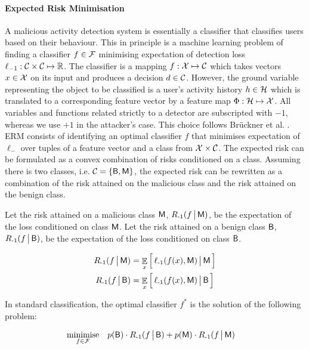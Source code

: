 \paragraph{Expected Risk Minimisation}
A malicious activity detection system is essentially a classifier that classifies users based on their behaviour. This in principle is a machine learning problem of finding a classifier $f \in \mathcal{F}$ minimising expectation of detection loss $\ell_{-1} : \mathcal{C} \times \mathcal{C} \mapsto \mathbb{R}$. The classifier is a mapping $f: \mathcal{X} \mapsto \mathcal{C}$ which takes vectors $x \in \mathcal{X}$ on its input and produces a decision $d \in \mathcal{C}$. However, the ground variable representing the object to be classified is a user's activity history $h \in \mathcal{H}$ which is translated to a corresponding feature vector by a feature map $\Phi: \mathcal{H} \mapsto \mathcal{X}$. All variables and functions related strictly to a detector are subscripted with $-1$, whereas we use $+1$ in the attacker's case. This choice follows Brückner et al. \cite{stackelberg_games}. ERM consists of identifying an optimal classifier $f$ that minimises expectation of $\ell_\minus$ over tuples of a feature vector and a class from $\mathcal{X} \times \mathcal{C}$. The expected risk can be formulated as a convex combination of risks conditioned on a class. Assuming there is two classes, i.e. $\mathcal{C} = \{ \mathsf{B}, \mathsf{M} \}$, the expected risk can be rewritten as a combination of the risk attained on the malicious class and the risk attained on the benign class.

\begin{definition}\label{def:risk}
    Let the risk attained on a malicious class $\mathsf{M}$, $R_{{\text{-}1}}(f \,\big|\, \mathsf{M})$, be the expectation of the loss conditioned on class $\mathsf{M}$. Let the risk attained on a benign class $\mathsf{B}$, $R_{{\text{-}1}}(f \,\big|\, \mathsf{B})$, be the expectation of the loss conditioned on class $\mathsf{B}$.

    \begin{align*}
        R_{{\text{-}1}}(f \,\big|\, \mathsf{M})  &= \mathop{\mathbb{E}}_{x} \Big[\, \ell_{{\text{-}1}}(f(x), \mathsf{M}) \,\big|\, \mathsf{M} \,\Big] \\
        R_{{\text{-}1}}(f \,\big|\, \mathsf{B})  &= \mathop{\mathbb{E}}_{x} \Big[\, \ell_{{\text{-}1}}(f(x), \mathsf{M}) \,\big|\, \mathsf{B} \,\Big]
    \end{align*}

\end{definition}

\begin{definition}\label{def:erm}
    In standard classification, the optimal classifier $f^*$ is the solution of the following problem:

    \begin{equation*}
        \begin{aligned}
        & \underset{f \in \mathcal{F}} {\text{minimise}}
        & & p(\mathsf{B}) \cdot R_{{\text{-}1}}(f \,\big|\, \mathsf{B})
        +
        p(\mathsf{M}) \cdot R_{{\text{-}1}}(f \,\big|\, \mathsf{M})
        \end{aligned}
    \end{equation*}
\end{definition}


